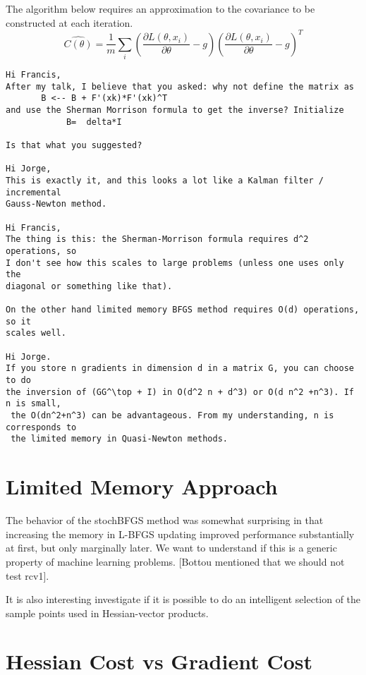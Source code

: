 \documentclass[12pt]{article}
\begin{document}
The algorithm below requires an approximation to the covariance to be constructed at each iteration. 
\begin{equation}
	\hat{C(\theta)} = \frac{1}{m} \sum_i \left( \frac{\partial L(\theta,x_i)}{\partial \theta}-g\right) \left(\frac{\partial L(\theta,x_i)}{\partial \theta}-g \right)^T
\end{equation}

\begin{verbatim}
Hi Francis,
After my talk, I believe that you asked: why not define the matrix as
       B <-- B + F'(xk)*F'(xk)^T
and use the Sherman Morrison formula to get the inverse? Initialize
            B=  delta*I

Is that what you suggested?

Hi Jorge,
This is exactly it, and this looks a lot like a Kalman filter / incremental 
Gauss-Newton method.

Hi Francis,
The thing is this: the Sherman-Morrison formula requires d^2 operations, so 
I don't see how this scales to large problems (unless one uses only the 
diagonal or something like that).

On the other hand limited memory BFGS method requires O(d) operations, so it 
scales well.

Hi Jorge.
If you store n gradients in dimension d in a matrix G, you can choose to do 
the inversion of (GG^\top + I) in O(d^2 n + d^3) or O(d n^2 +n^3). If n is small,
 the O(dn^2+n^3) can be advantageous. From my understanding, n is corresponds to 
 the limited memory in Quasi-Newton methods.
\end{verbatim}


\section{Limited Memory Approach}
\label{memory}

The behavior of the stochBFGS method was somewhat surprising in that increasing the memory in L-BFGS updating
improved performance substantially at first, but only marginally later. We want to understand if this is a generic property of
machine learning problems. [Bottou mentioned that we should not test rcv1].

It is also interesting investigate if it is possible to do an intelligent selection of the sample points used in Hessian-vector products.

\section{Hessian Cost vs Gradient Cost}
\label{coordinate}
\end{document}

